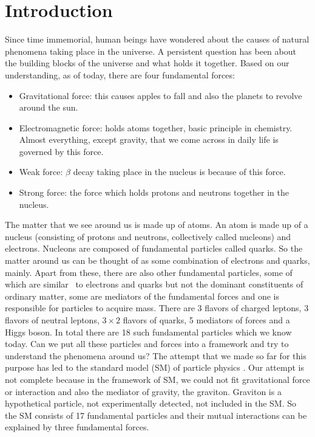 \chapter{Introduction} %

\label{Chap0}
Since time immemorial, human beings have wondered about the causes of natural phenomena taking place in the universe.
A persistent question has been about the building blocks of the universe and what holds it together.
Based on our understanding, as of today, there are four fundamental forces:
\begin{itemize}
\item Gravitational force: this causes apples to fall and also the planets to revolve around the sun.
\item Electromagnetic force: holds atoms together, basic principle in chemistry. Almost everything, except gravity, that we come across in daily life is governed by this force.
\item Weak force: $\beta$ decay taking place in the nucleus is because of this force.
\item Strong force: the force which holds protons and neutrons together in the nucleus.
\end{itemize}
The matter that we see around us is made up of atoms. An atom is made up of a nucleus (consisting of protons and neutrons, collectively 
called nucleons) and electrons. Nucleons are composed of fundamental particles called quarks. So the matter around us can be thought of as 
some combination of electrons and quarks, mainly. Apart from these, there are also other fundamental particles, some of which are similar \
to electrons and quarks but not the dominant constituents of ordinary matter, some are mediators of the fundamental forces and one
is responsible for particles to acquire mass. There are 3 flavors of charged leptons, 3 flavors of neutral leptons, $3\times2$ flavors of 
quarks, 5 mediators of forces and a Higgs boson. In total there are 18 such fundamental particles which we know today. Can we put all these 
particles and forces into a framework and try to understand the phenomena around us? The attempt that we made so far for this purpose has 
led to the standard model (SM) of particle physics \cite{PhysRevLett.19.1264,RevModPhys.52.525,GLASHOW1961579}. Our attempt is not 
complete because in the framework of SM, we could not fit gravitational force or interaction and also the mediator of gravity, the 
graviton. Graviton is a hypothetical particle, not experimentally detected, not included in the SM. So the SM consists of 17 fundamental 
particles and their mutual interactions can be explained by three fundamental forces.

